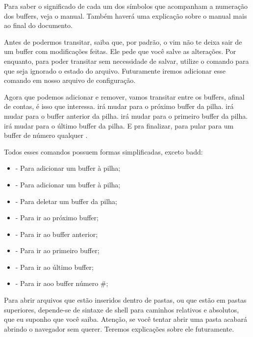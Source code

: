 Para saber o significado de cada um dos símbolos que acompanham a numeração dos buffers, veja o manual.
Também haverá uma explicação sobre o manual mais ao final do documento.

Antes de podermos transitar, saiba que, por padrão, o vim não te deixa sair de um buffer com modificações feitas.
Ele pede que você salve as alterações.
Por enquanto, para poder transitar sem necessidade de salvar, utilize o comando  para
que seja ignorado o estado do arquivo.
Futuramente iremos adicionar esse comando em nosso arquivo de configuração.



Agora que podemos adicionar e remover, vamos transitar entre os buffers, afinal de contas, é isso que interessa.
 irá mudar para o próximo buffer da pilha.
 irá mudar para o buffer anterior da pilha.
 irá mudar para o primeiro buffer da pilha.
 irá mudar para o último buffer da pilha.
E pra finalizar, para pular para um buffer de número qualquer .

Todos esses comandos possuem formas simplificadas, exceto badd:
\begin{itemize}
    \item {} - Para adicionar um buffer à pilha;
    \item {} - Para adicionar um buffer à pilha;
    \item {} - Para deletar um buffer da pilha;
    \item {} - Para ir ao próximo buffer;
    \item {} - Para ir ao buffer anterior;
    \item {} - Para ir ao primeiro buffer;
    \item {} - Para ir ao último buffer;
    \item {} - Para ir aoo buffer número \#;
\end{itemize}

Para abrir arquivos que estão inseridos dentro de pastas, ou que estão em pastas superiores,
depende-se de sintaxe de shell para caminhos relativos e absolutos, que eu suponho que você saiba.
Atenção, se você tentar abrir uma pasta acabará abrindo o navegador sem querer.
Teremos explicações sobre ele futuramente.

